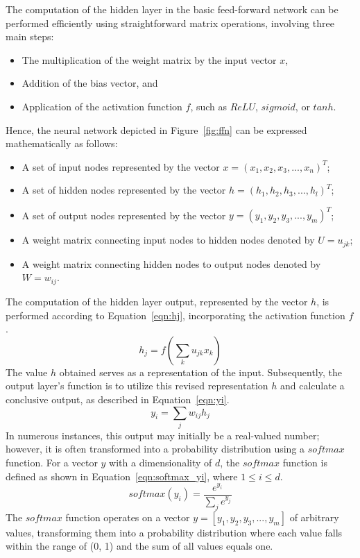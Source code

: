 The computation of the hidden layer in the basic feed-forward network can be performed efficiently using straightforward matrix operations, involving three main steps:
\begin{itemize}
	\item The multiplication of the weight matrix by the input vector $x$,
	\item Addition of the bias vector, and
	\item Application of the activation function $f$, such as $ReLU$, $sigmoid$, or $tanh$.
\end{itemize}
Hence, the neural network depicted in Figure~\ref{fig:ffn} can be expressed mathematically as follows: 
\begin{itemize}
	\item A set of input nodes represented by the vector $x = (x_1, x_2, x_3, . . . , x_n)^T$;
	\item A set of hidden nodes represented by the vector $h = (h_1, h_2, h_3, . . . , h_l)^T$;
	\item A set of output nodes represented by the vector $y = (y_1, y_2, y_3, . . . , y_m)^T$;
	\item A weight matrix connecting input nodes to hidden nodes denoted by $U = u_{jk}$;
	\item A weight matrix connecting hidden nodes to output nodes denoted by $W = w_{ij}$.
\end{itemize}
The computation of the hidden layer output, represented by the vector $h$, is performed according to Equation~\ref{eqn:hj}, incorporating the activation function $f$.
\begin{equation}
	h_j = f(\sum_{k}u_{jk}x_k)
	\label{eqn:hj}
\end{equation}
The value $h$ obtained serves as a representation of the input. 
Subsequently, the output layer's function is to utilize this revised representation $h$ and calculate a conclusive output, as described in Equation~\ref{eqn:yi}.
\begin{equation}
	y_i = \sum_{j}w_{ij}h_j
	\label{eqn:yi}
\end{equation}
In numerous instances, this output may initially be a real-valued number; however, it is often transformed into a probability distribution using a $softmax$ function. For a vector $y$ with a dimensionality of $d$, the $softmax$ function is defined as shown in Equation~\ref{eqn:softmax_yi}, where $1 \leq i \leq d$.
\begin{equation}
	softmax(y_i) =\frac{e^{y_i}}{\sum_{j}e^{y_j}}
	\label{eqn:softmax_yi}
\end{equation}
The $softmax$ function operates on a vector $y = [y_1, y_2, y_3, . . . , y_m]$ of arbitrary values, transforming them into a probability distribution where each value falls within the range of (0, 1) and the sum of all values equals one.

